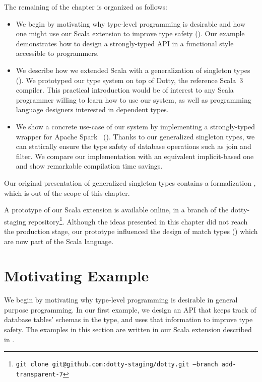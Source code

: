 The remaining of the chapter is organized as follows:

\begin{itemize}
\item
  We begin by motivating why type-level programming is desirable and how one might use our Scala extension to improve type safety (). Our example demonstrates how to design a strongly-typed API in a functional style accessible to programmers.
\item
  We describe how we extended Scala with a generalization of singleton types ().
  We prototyped our type system on top of Dotty, the reference Scala~3 compiler.
  This practical introduction would be of interest to any Scala programmer willing to learn how to use our system, as well as programming language designers interested in dependent types.
\item
  We show a concrete use-case of our system by implementing a strongly-typed wrapper for Apache Spark~\citep{zaharia2016apache} ().
  Thanks to our generalized singleton types, we can statically ensure the type safety of database operations such as join and filter.
  We compare our implementation with an equivalent implicit-based one and show remarkable compilation time savings.
\end{itemize}

Our original presentation of generalized singleton types contains a formalization \citep[Section 3 and 4]{schmid2020coming}, which is out of the scope of this chapter.

\begin{diff}
A prototype of our Scala extension is available online, in a branch of the dotty-staging repository\footnote{\texttt{git clone git@github.com:dotty-staging/dotty.git --branch add-transparent-7}}.
Although the ideas presented in this chapter did not reach the production stage, our prototype influenced the design of match types () which are now part of the Scala language.
\end{diff}

\section{Motivating Example}
\label{sec:motivating-example}

We begin by motivating why type-level programming is desirable in general purpose programming.
In our first example, we design an API that keeps track of database tables' schemas in the type, and uses that information to improve type safety.
The examples in this section are written in our Scala extension described in .

